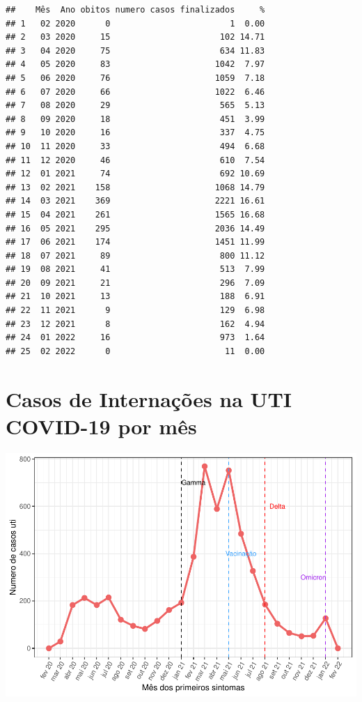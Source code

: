 \documentclass[
]{article}
\begin{document}
\begin{verbatim}
##    Mês  Ano obitos numero casos finalizados     %
## 1   02 2020      0                        1  0.00
## 2   03 2020     15                      102 14.71
## 3   04 2020     75                      634 11.83
## 4   05 2020     83                     1042  7.97
## 5   06 2020     76                     1059  7.18
## 6   07 2020     66                     1022  6.46
## 7   08 2020     29                      565  5.13
## 8   09 2020     18                      451  3.99
## 9   10 2020     16                      337  4.75
## 10  11 2020     33                      494  6.68
## 11  12 2020     46                      610  7.54
## 12  01 2021     74                      692 10.69
## 13  02 2021    158                     1068 14.79
## 14  03 2021    369                     2221 16.61
## 15  04 2021    261                     1565 16.68
## 16  05 2021    295                     2036 14.49
## 17  06 2021    174                     1451 11.99
## 18  07 2021     89                      800 11.12
## 19  08 2021     41                      513  7.99
## 20  09 2021     21                      296  7.09
## 21  10 2021     13                      188  6.91
## 22  11 2021      9                      129  6.98
## 23  12 2021      8                      162  4.94
## 24  01 2022     16                      973  1.64
## 25  02 2022      0                       11  0.00
\end{verbatim}

\hypertarget{casos-de-internauxe7uxf5es-na-uti-covid-19-por-muxeas}{%
\section{Casos de Internações na UTI COVID-19 por
mês}\label{casos-de-internauxe7uxf5es-na-uti-covid-19-por-muxeas}}

\includegraphics{analises_variantes_files/figure-latex/unnamed-chunk-6-1.pdf}
\end{document}
